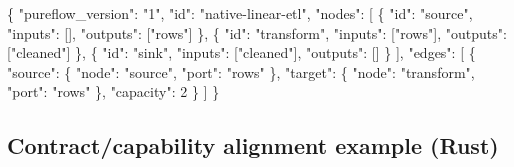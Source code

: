\documentclass[
  letterpaper,
]{report}
\newenvironment{Shaded}{\begin{snugshade}}{\end{snugshade}}
\newcommand{\DataTypeTok}[1]{\textcolor[rgb]{0.68,0.00,0.00}{#1}}
\newcommand{\DecValTok}[1]{\textcolor[rgb]{0.68,0.00,0.00}{#1}}
\newcommand{\FunctionTok}[1]{\textcolor[rgb]{0.28,0.35,0.67}{#1}}
\newcommand{\OtherTok}[1]{\textcolor[rgb]{0.00,0.23,0.31}{#1}}
\newcommand{\StringTok}[1]{\textcolor[rgb]{0.13,0.47,0.30}{#1}}
\begin{document}
\begin{Shaded}
\begin{Highlighting}[]
\FunctionTok{\{}
  \DataTypeTok{"pureflow\_version"}\FunctionTok{:} \StringTok{"1"}\FunctionTok{,}
  \DataTypeTok{"id"}\FunctionTok{:} \StringTok{"native{-}linear{-}etl"}\FunctionTok{,}
  \DataTypeTok{"nodes"}\FunctionTok{:} \OtherTok{[}
    \FunctionTok{\{} \DataTypeTok{"id"}\FunctionTok{:} \StringTok{"source"}\FunctionTok{,} \DataTypeTok{"inputs"}\FunctionTok{:} \OtherTok{[]}\FunctionTok{,} \DataTypeTok{"outputs"}\FunctionTok{:} \OtherTok{[}\StringTok{"rows"}\OtherTok{]} \FunctionTok{\}}\OtherTok{,}
    \FunctionTok{\{} \DataTypeTok{"id"}\FunctionTok{:} \StringTok{"transform"}\FunctionTok{,} \DataTypeTok{"inputs"}\FunctionTok{:} \OtherTok{[}\StringTok{"rows"}\OtherTok{]}\FunctionTok{,} \DataTypeTok{"outputs"}\FunctionTok{:} \OtherTok{[}\StringTok{"cleaned"}\OtherTok{]} \FunctionTok{\}}\OtherTok{,}
    \FunctionTok{\{} \DataTypeTok{"id"}\FunctionTok{:} \StringTok{"sink"}\FunctionTok{,} \DataTypeTok{"inputs"}\FunctionTok{:} \OtherTok{[}\StringTok{"cleaned"}\OtherTok{]}\FunctionTok{,} \DataTypeTok{"outputs"}\FunctionTok{:} \OtherTok{[]} \FunctionTok{\}}
  \OtherTok{]}\FunctionTok{,}
  \DataTypeTok{"edges"}\FunctionTok{:} \OtherTok{[}
    \FunctionTok{\{}
      \DataTypeTok{"source"}\FunctionTok{:} \FunctionTok{\{} \DataTypeTok{"node"}\FunctionTok{:} \StringTok{"source"}\FunctionTok{,} \DataTypeTok{"port"}\FunctionTok{:} \StringTok{"rows"} \FunctionTok{\},}
      \DataTypeTok{"target"}\FunctionTok{:} \FunctionTok{\{} \DataTypeTok{"node"}\FunctionTok{:} \StringTok{"transform"}\FunctionTok{,} \DataTypeTok{"port"}\FunctionTok{:} \StringTok{"rows"} \FunctionTok{\},}
      \DataTypeTok{"capacity"}\FunctionTok{:} \DecValTok{2}
    \FunctionTok{\}}
  \OtherTok{]}
\FunctionTok{\}}
\end{Highlighting}
\end{Shaded}

\subsection{Contract/capability alignment example
(Rust)}\label{contractcapability-alignment-example-rust}
\end{document}
